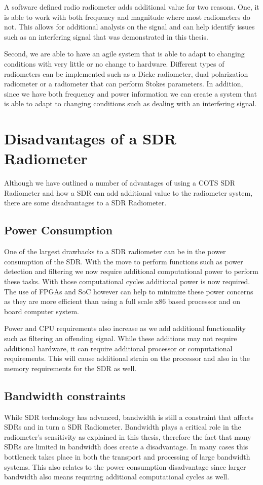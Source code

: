 {A software defined radio radiometer adds additional value for two reasons.  One, it is able to work with both frequency and magnitude where most radiometers do not.  This allows for additional analysis on the signal and can help identify issues such as an interfering signal that was demonstrated in this thesis.  

Second, we are able to have an agile system that is able to adapt to changing conditions with very little or no change to hardware.  Different types of radiometers can be implemented such as a Dicke radiometer, dual polarization radiometer or a radiometer that can perform Stokes parameters.  In addition, since we have both frequency and power information we can create a system that is able to adapt to changing conditions such as dealing with an interfering signal.  

\section{Disadvantages of a SDR Radiometer}
Although we have outlined a number of advantages of using a COTS SDR Radiometer and how a SDR can add additional value to the radiometer system, there are some disadvantages to a SDR Radiometer.

\subsection{Power Consumption}
One of the largest drawbacks to a SDR radiometer can be in the power consumption of the SDR.  With the move to perform functions such as power detection and filtering we now require additional computational power to perform these tasks.  With those computational cycles additional power is now required.  The use of FPGAs and SoC however can help to minimize these power concerns as they are more efficient than using a full scale x86 based processor and on board computer system.  

Power and CPU requirements also increase as we add additional functionality such as filtering an offending signal.  While these additions may not require additional hardware, it can require additional processor or computational requirements.  This will cause additional strain on the processor and also in the memory requirements for the SDR as well.

\subsection{Bandwidth constraints}
While SDR technology has advanced, bandwidth is still a constraint that affects SDRs and in turn a SDR Radiometer.  Bandwidth plays a critical role in the radiometer's sensitivity as explained in this thesis, therefore the fact that many SDRs are limited in bandwidth does create a disadvantage.  In many cases this bottleneck takes place in both the transport and processing of large bandwidth systems.  This also relates to the power consumption disadvantage since larger bandwidth also means requiring additional computational cycles as well.  

}

